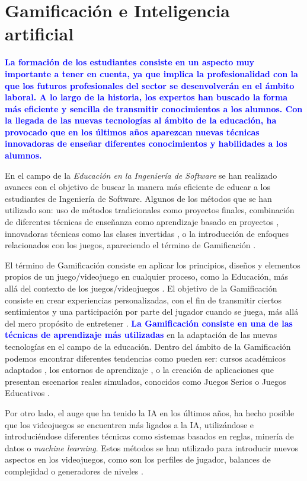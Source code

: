 \section{Gamificación e Inteligencia artificial}
\label{sec:Gamificacion}
\textbf{\textcolor{blue}{La formación de los estudiantes consiste en un aspecto muy importante a tener en cuenta, ya que implica la profesionalidad con la que los futuros profesionales del sector se desenvolverán en el ámbito laboral. A lo largo de la historia, los expertos han buscado la forma más eficiente y sencilla de transmitir conocimientos a los alumnos. Con la llegada de las nuevas tecnologías al ámbito de la educación, ha provocado que en los últimos años aparezcan nuevas técnicas innovadoras de enseñar diferentes conocimientos y habilidades a los alumnos.}}

En el campo de la \emph{Educación en la Ingeniería de Software} se han realizado avances con el objetivo de buscar la manera más eficiente de educar a los estudiantes de Ingeniería de Software. Algunos de los métodos que se han utilizado son: uso de métodos tradicionales como proyectos finales, combinación de diferentes técnicas de enseñanza como aprendizaje basado en proyectos \cite{alabbadi2016proposed}, innovadoras técnicas como las clases invertidas \cite{choi2013applying}, o la introducción de enfoques relacionados con los juegos, apareciendo el término de Gamificación \cite{connolly2007application}.

El término de Gamificación consiste en aplicar los principios, diseños y elementos propios de un juego/videojuego en cualquier proceso, como la Educación, más allá del contexto de los juegos/videojuegos \cite{gallego2014panoramica}. El objetivo de la Gamificación consiste en crear experiencias personalizadas, con el fin de transmitir ciertos sentimientos y una participación por parte del jugador cuando se juega, más allá del mero propósito de entretener \cite{alhammad2018gamification}. \textbf{\textcolor{blue}{La Gamificación consiste en una de las técnicas de aprendizaje más utilizadas}} en la adaptación de las nuevas tecnologías en el campo de la educación. Dentro del ámbito de la Gamificación podemos encontrar diferentes tendencias como pueden ser: cursos académicos adaptados \cite{murphy2008distance}, los entornos de aprendizaje \cite{burnell2002teaching}, o la creación de aplicaciones que presentan escenarios reales simulados, conocidos como Juegos Serios o Juegos Educativos \cite{meneely2009preparing}.

Por otro lado, el auge que ha tenido la IA en los últimos años, ha hecho posible que los videojuegos se encuentren más ligados a la IA, utilizándose e introduciéndose diferentes técnicas como sistemas basados en reglas, minería de datos o \emph{machine learning}. Estos métodos se han utilizado para introducir nuevos aspectos en los videojuegos, como son los perfiles de jugador, balances de complejidad o generadores de niveles \cite{westera2020artificial}.

